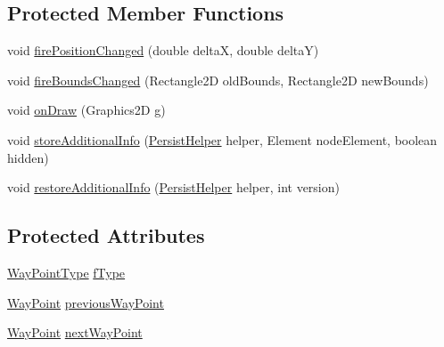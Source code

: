 \subsection*{Protected Member Functions}
\begin{DoxyCompactItemize}
\item 
void \hyperlink{classorg_1_1tzi_1_1use_1_1gui_1_1views_1_1diagrams_1_1waypoints_1_1_way_point_a00f1993415c9d33aa339737991fd15d8}{fire\-Position\-Changed} (double delta\-X, double delta\-Y)
\item 
void \hyperlink{classorg_1_1tzi_1_1use_1_1gui_1_1views_1_1diagrams_1_1waypoints_1_1_way_point_ad1eb94f7a4d451a08a36b6e2fda7e8aa}{fire\-Bounds\-Changed} (Rectangle2\-D old\-Bounds, Rectangle2\-D new\-Bounds)
\item 
void \hyperlink{classorg_1_1tzi_1_1use_1_1gui_1_1views_1_1diagrams_1_1waypoints_1_1_way_point_aa7498223f5c2b3ad4eaca37c707bc399}{on\-Draw} (Graphics2\-D g)
\item 
void \hyperlink{classorg_1_1tzi_1_1use_1_1gui_1_1views_1_1diagrams_1_1waypoints_1_1_way_point_ab4274b12a06098030b7ce126f2b24fbe}{store\-Additional\-Info} (\hyperlink{classorg_1_1tzi_1_1use_1_1gui_1_1util_1_1_persist_helper}{Persist\-Helper} helper, Element node\-Element, boolean hidden)
\item 
void \hyperlink{classorg_1_1tzi_1_1use_1_1gui_1_1views_1_1diagrams_1_1waypoints_1_1_way_point_ab3ab81b0989ee985d9571b819f00c1b6}{restore\-Additional\-Info} (\hyperlink{classorg_1_1tzi_1_1use_1_1gui_1_1util_1_1_persist_helper}{Persist\-Helper} helper, int version)
\end{DoxyCompactItemize}
\subsection*{Protected Attributes}
\begin{DoxyCompactItemize}
\item 
\hyperlink{enumorg_1_1tzi_1_1use_1_1gui_1_1views_1_1diagrams_1_1waypoints_1_1_way_point_type}{Way\-Point\-Type} \hyperlink{classorg_1_1tzi_1_1use_1_1gui_1_1views_1_1diagrams_1_1waypoints_1_1_way_point_aa1b2a846aa2d1605fe63a1f05a1d958e}{f\-Type}
\item 
\hyperlink{classorg_1_1tzi_1_1use_1_1gui_1_1views_1_1diagrams_1_1waypoints_1_1_way_point}{Way\-Point} \hyperlink{classorg_1_1tzi_1_1use_1_1gui_1_1views_1_1diagrams_1_1waypoints_1_1_way_point_acfbb3ccd53ce4deaf5a8240d49367125}{previous\-Way\-Point}
\item 
\hyperlink{classorg_1_1tzi_1_1use_1_1gui_1_1views_1_1diagrams_1_1waypoints_1_1_way_point}{Way\-Point} \hyperlink{classorg_1_1tzi_1_1use_1_1gui_1_1views_1_1diagrams_1_1waypoints_1_1_way_point_a474962722f712c8477509df9e9cf60fc}{next\-Way\-Point}
\end{DoxyCompactItemize}


